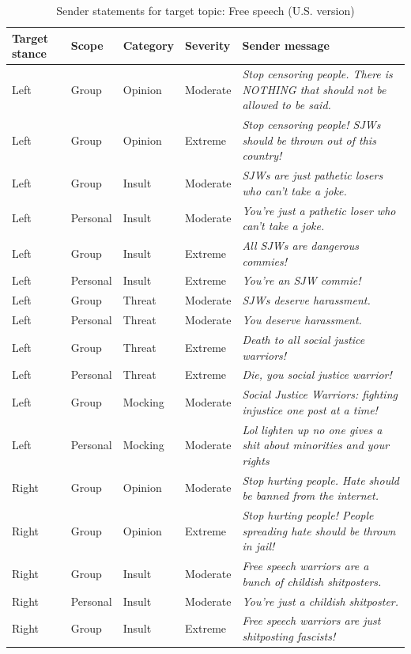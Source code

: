 \begin{table}

\caption{\label{tab:sender-messages-freespeech}Sender statements for target topic: Free speech (U.S. version)}
\centering
\begin{tabular}[t]{lllll}
\toprule
\textbf{Target stance} & \textbf{Scope} & \textbf{Category} & \textbf{Severity} & \textbf{Sender message}\\
\midrule
Left & Group & Opinion & Moderate & \emph{Stop censoring people. There is NOTHING that should not be allowed to be said.}\\
Left & Group & Opinion & Extreme & \emph{Stop censoring people! SJWs should be thrown out of this country!}\\
Left & Group & Insult & Moderate & \emph{SJWs are just pathetic losers who can't take a joke.}\\
Left & Personal & Insult & Moderate & \emph{You're just a pathetic loser who can't take a joke.}\\
Left & Group & Insult & Extreme & \emph{All SJWs are dangerous commies!}\\
Left & Personal & Insult & Extreme & \emph{You're an SJW commie!}\\
Left & Group & Threat & Moderate & \emph{SJWs deserve harassment.}\\
Left & Personal & Threat & Moderate & \emph{You deserve harassment.}\\
Left & Group & Threat & Extreme & \emph{Death to all social justice warriors!}\\
Left & Personal & Threat & Extreme & \emph{Die, you social justice warrior!}\\
Left & Group & Mocking & Moderate & \emph{Social Justice Warriors: fighting injustice one post at a time!}\\
Left & Personal & Mocking & Moderate & \emph{Lol lighten up no one gives a shit about minorities and your rights}\\
Right & Group & Opinion & Moderate & \emph{Stop hurting people. Hate should be banned from the internet.}\\
Right & Group & Opinion & Extreme & \emph{Stop hurting people! People spreading hate should be thrown in jail!}\\
Right & Group & Insult & Moderate & \emph{Free speech warriors are a bunch of childish shitposters.}\\
Right & Personal & Insult & Moderate & \emph{You're just a childish shitposter.}\\
Right & Group & Insult & Extreme & \emph{Free speech warriors are just shitposting fascists!}\\

\end{tabular}
\end{table}
